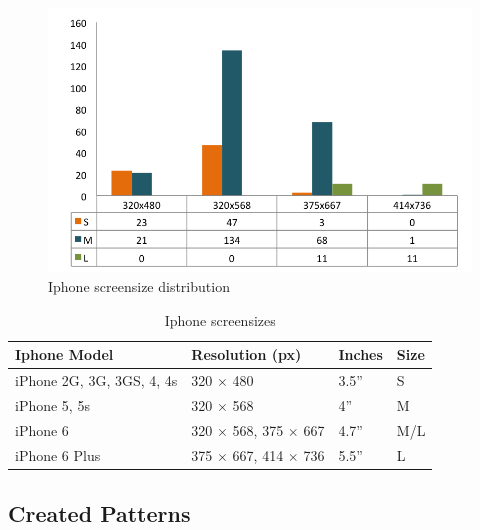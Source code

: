 {{    %
    \begin{figure}[H]
      \centering
      \includegraphics[scale=0.85]{pics/analysis/IphoneScreenDist.png}
      \caption{Iphone screensize distribution}
      \label{fig:iphoneScreenDist}
    \end{figure}

    \begin{table}[H]
      \centering
      \begin{tabular}{ l | l | l | l }
        \hline
        {\bf Iphone Model}  & {\bf Resolution (px)} & {\bf Inches} & {\bf Size} \\ \hline
        iPhone 2G, 3G, 3GS, 4, 4s  &  320 $\times$ 480  &  3.5'' & S\\
        iPhone 5, 5s        &  320 $\times$ 568  &  4'' & M \\
        iPhone 6            &  320 $\times$ 568, 375 $\times$ 667  &  4.7'' & M/L \\
        iPhone 6 Plus       &  375 $\times$ 667, 414 $\times$ 736  &  5.5'' & L \\ \hline        
      \end{tabular}
      \caption{Iphone screensizes}
      \label{tab:iphonescreen}
    \end{table}

    

    

  \clearpage
	\subsection{Created Patterns} \label{sec:createdpatterns}

}}
